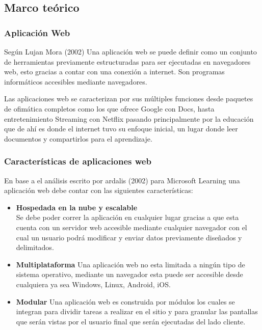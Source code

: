 \documentclass[12pt]{book}
\begin{document}
\begin{enumerate}
  
    	 
    	\section{Marco teórico}
    	
    	\subsubsection{Aplicación Web}
    	Según Lujan Mora (2002) Una aplicación web se puede definir como un conjunto de herramientas previamente estructuradas para ser ejecutadas en navegadores web, esto gracias a contar con una conexión a internet. Son programas informáticos accesibles mediante navegadores. 
    	
    	Las aplicaciones web se caracterizan por sus múltiples funciones desde paquetes de ofimática completos como los que ofrece Google con Docs, hasta entretenimiento Streaming con Netflix pasando principalmente por la educación que de ahí es donde el internet tuvo su enfoque inicial, un lugar donde leer documentos y compartirlos para el aprendizaje.   
    	
    	\subsubsection{Características de aplicaciones web}
    	En base a el análisis escrito por ardalis (2002) para Microsoft Learning una aplicación web debe contar con las siguientes características:
    	
    	\begin{itemize}
    		\item \textbf{Hospedada en la nube y escalable}\\
    		Se debe poder correr la aplicación en cualquier lugar gracias a que esta cuenta con un servidor web accesible mediante cualquier navegador con el cual un usuario podrá modificar y enviar datos previamente diseñados y delimitados. 
    		
    		\item \textbf{Multiplataforma}
    		Una aplicación web no esta limitada a ningún tipo de sistema operativo, mediante un navegador esta puede ser accesible desde cualquiera ya sea Windows, Linux, Android, iOS. 
    		
    		\item \textbf{Modular}
    		Una aplicación web es construida por módulos los cuales se integran para dividir tareas a realizar en el sitio y para granular las pantallas que serán vistas por el usuario final que serán ejecutadas del lado cliente. 
    		

\end{itemize}
\end{enumerate}
\end{document}
